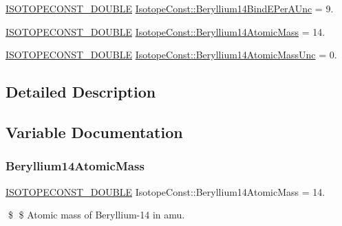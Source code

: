 \begin{DoxyCompactItemize}
\mbox{\hyperlink{group___isotope_const-_macros_ga8f45a7272ce02c0b4c65c44636ed719a}{I\+S\+O\+T\+O\+P\+E\+C\+O\+N\+S\+T\+\_\+\+D\+O\+U\+B\+LE}} \mbox{\hyperlink{group___isotope_const-_beryllium-_be14_gabffe21aefcc146c523ed6288bae51b0d}{Isotope\+Const\+::\+Beryllium14\+Bind\+E\+Per\+A\+Unc}} = 9.
\item 
\mbox{\hyperlink{group___isotope_const-_macros_ga8f45a7272ce02c0b4c65c44636ed719a}{I\+S\+O\+T\+O\+P\+E\+C\+O\+N\+S\+T\+\_\+\+D\+O\+U\+B\+LE}} \mbox{\hyperlink{group___isotope_const-_beryllium-_be14_ga9872ebf71d028f165b2f2723165de334}{Isotope\+Const\+::\+Beryllium14\+Atomic\+Mass}} = 14.
\item 
\mbox{\hyperlink{group___isotope_const-_macros_ga8f45a7272ce02c0b4c65c44636ed719a}{I\+S\+O\+T\+O\+P\+E\+C\+O\+N\+S\+T\+\_\+\+D\+O\+U\+B\+LE}} \mbox{\hyperlink{group___isotope_const-_beryllium-_be14_ga9c59813e2aa8de0216bb412c2f16e000}{Isotope\+Const\+::\+Beryllium14\+Atomic\+Mass\+Unc}} = 0.
\end{DoxyCompactItemize}


\subsection{Detailed Description}


\subsection{Variable Documentation}
\mbox{\label{group___isotope_const-_beryllium-_be14_ga9872ebf71d028f165b2f2723165de334}} 
\subsubsection{\texorpdfstring{Beryllium14\+Atomic\+Mass}{Beryllium14AtomicMass}}
{\footnotesize\ttfamily \mbox{\hyperlink{group___isotope_const-_macros_ga8f45a7272ce02c0b4c65c44636ed719a}{I\+S\+O\+T\+O\+P\+E\+C\+O\+N\+S\+T\+\_\+\+D\+O\+U\+B\+LE}} Isotope\+Const\+::\+Beryllium14\+Atomic\+Mass = 14.}

\$ \$ Atomic mass of Beryllium-\/14 in amu. \mbox{\label{group___isotope_const-_beryllium-_be14_ga9c59813e2aa8de0216bb412c2f16e000}} 
